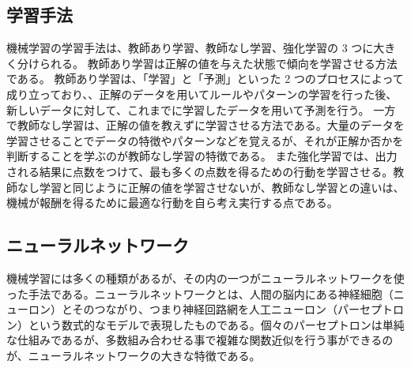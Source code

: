 \subsection{学習手法}
機械学習の学習手法は、教師あり学習、教師なし学習、強化学習の 3 つに大きく分けられる。
教師あり学習は正解の値を与えた状態で傾向を学習させる方法である。
教師あり学習は、「学習」と「予測」といった 2 つのプロセスによって成り立っており、、正解のデータを用いてルールやパターンの学習を行った後、新しいデータに対して、これまでに学習したデータを用いて予測を行う。
一方で教師なし学習は、正解の値を教えずに学習させる方法である。大量のデータを学習させることでデータの特徴やパターンなどを覚えるが、それが正解か否かを判断することを学ぶのが教師なし学習の特徴である。
また強化学習では、出力される結果に点数をつけて、最も多くの点数を得るための行動を学習させる。教師なし学習と同じように正解の値を学習させないが、教師なし学習との違いは、機械が報酬を得るために最適な行動を自ら考え実行する点である。

\subsection{ニューラルネットワーク}
機械学習には多くの種類があるが、その内の一つがニューラルネットワークを使った手法である。ニューラルネットワークとは、人間の脳内にある神経細胞（ニューロン）とそのつながり、つまり神経回路網を人工ニューロン（パーセプトロン）という数式的なモデルで表現したものである。個々のパーセプトロンは単純な仕組みであるが、多数組み合わせる事で複雑な関数近似を行う事ができるのが、ニューラルネットワークの大きな特徴である。

